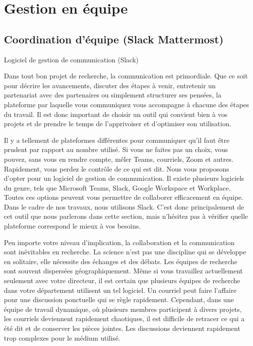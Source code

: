 \documentclass[
  letterpaper,
  DIV=11,
  numbers=noendperiod]{scrreprt}
\begin{document}
\section{Gestion en équipe}\label{gestion-en-uxe9quipe}

\subsection{Coordination d'équipe (Slack
Mattermost)}\label{coordination-duxe9quipe-slack-mattermost}

Logiciel de gestion de communication (Slack)

Dans tout bon projet de recherche, la communication est primordiale. Que
ce soit pour décrire les avancements, discuter des étapes à venir,
entretenir un partenariat avec des partenaires ou simplement structurer
ses pensées, la plateforme par laquelle vous communiquez vous accompagne
à chacune des étapes du travail. Il est donc important de choisir un
outil qui convient bien à vos projets et de prendre le temps de
l'apprivoiser et d'optimiser son utilisation.

Il y a tellement de plateformes différentes pour communiquer qu'il faut
être prudent par rapport au nombre utilisé. Si vous ne faites pas un
choix, vous pouvez, sans vous en rendre compte, mêler Teams, courriels,
Zoom et autres. Rapidement, vous perdez le contrôle de ce qui est dit.
Nous vous proposons d'opter pour un logiciel de gestion de
communication. Il existe plusieurs logiciels du genre, tels que
Microsoft Teams, Slack, Google Workspace et Workplace. Toutes ces
options peuvent vous permettre de collaborer efficacement en équipe.
Dans le cadre de nos travaux, nous utilisons Slack. C'est donc
principalement de cet outil que nous parlerons dans cette section, mais
n'hésitez pas à vérifier quelle plateforme correspond le mieux à vos
besoins.

Peu importe votre niveau d'implication, la collaboration et la
communication sont inévitables en recherche. La science n'est pas une
discipline qui se développe en solitaire, elle nécessite des échanges et
des débats. Les équipes de recherche sont souvent dispersées
géographiquement. Même si vous travaillez actuellement seulement avec
votre directeur, il est certain que plusieurs équipes de recherche dans
votre département utilisent un tel logiciel. Un courriel peut faire
l'affaire pour une discussion ponctuelle qui se règle rapidement.
Cependant, dans une équipe de travail dynamique, où plusieurs membres
participent à divers projets, les courriels deviennent rapidement
chaotiques, il est difficile de retracer ce qui a été dit et de
conserver les pièces jointes. Les discussions deviennent rapidement trop
complexes pour le médium utilisé.
\end{document}
